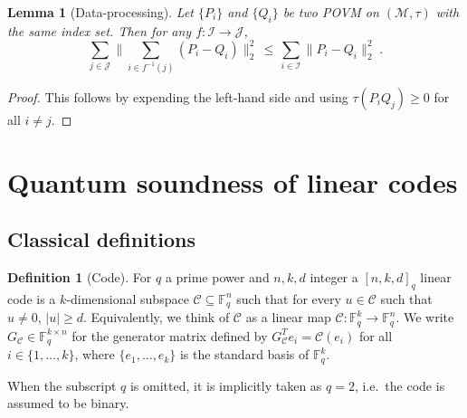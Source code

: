 \documentclass[11pt]{article}
\newtheorem{lemma}[theorem]{Lemma}
\theoremstyle{definition}
\newtheorem{definition}[theorem]{Definition}
\newcommand{\code}{\mathcal{C}}
\newcommand{\field}{\mathbb{F}_2}
\newcommand{\F}{\ensuremath{\mathbb{F}}}
\newcommand{\mM}{\ensuremath{\mathcal{M}}}
\newcommand{\mI}{\ensuremath{\mathcal{I}}}
\newcommand{\mJ}{\ensuremath{\mathcal{J}}}
\newcommand{\ind}{\ensuremath{\mathrm{ind}}}
\newcommand{\rand}{\textrm{rand}}
\begin{document}
\begin{lemma}[Data-processing]\label{lem:dp}
Let $\{P_i\}$ and $\{Q_i\}$ be two POVM on $(\mM,\tau)$ with the same index set. Then for any $f:\mI\to \mJ$, 
\begin{equation}\label{eq:dp}
\sum_{j\in \mJ} \Big\| \sum_{i\in f^{-1}(j)} (P_i-Q_i) \Big\|_2^2 \,\leq\, \sum_{i\in \mI} \big\| P_i-Q_i\big\|_2^2\;.
\end{equation}
\end{lemma}

\begin{proof}
This follows by expending the left-hand side and using $\tau(P_iQ_j)\geq 0$ for all $i\neq j$. 
\end{proof}
	
\section{Quantum soundness of linear codes}

\subsection{Classical definitions}

\begin{definition}[Code]
For $q$ a prime power and $n,k,d$ integer
a $[n,k,d]_q$ linear code is a $k$-dimensional subspace $\code\subseteq \F_q^n$ such that for every $u\in \code$ such that $u\neq 0$, $|u|\geq d$. Equivalently, we think of $\code$ as a linear map $\code:\F_q^k\to \F_q^n$. We write $G_\code \in \F_q^{k\times n}$ for the generator matrix defined by $ G_\code^T e_i =\code(e_i)$ for all $i\in\{1,\ldots,k\}$, where $\{e_1,\ldots,e_k\}$ is the standard basis of $\F_q^k$. 
\end{definition}

When the subscript $q$ is omitted, it is implicitly taken as $q=2$, i.e.\ the code is assumed to be binary. 


\end{document}
